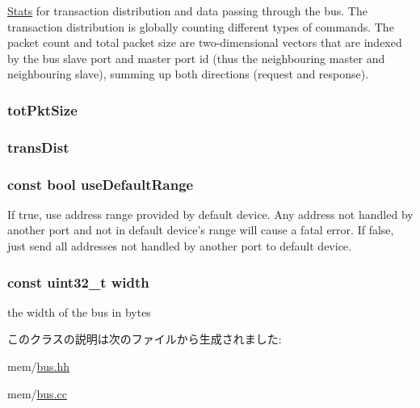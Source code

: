 \label{classBaseBus_ac7ddaff47c2ff8945ba85797af602673}
\hyperlink{namespaceStats}{Stats} for transaction distribution and data passing through the bus. The transaction distribution is globally counting different types of commands. The packet count and total packet size are two-\/dimensional vectors that are indexed by the bus slave port and master port id (thus the neighbouring master and neighbouring slave), summing up both directions (request and response). \hypertarget{classBaseBus_a1b2222f1cfbd8c191ad8d1099fd24848}{
\subsubsection[{totPktSize}]{ {\bf totPktSize}}}
\label{classBaseBus_a1b2222f1cfbd8c191ad8d1099fd24848}
\hypertarget{classBaseBus_a3eb88cd36449bb56229422858d34194d}{
\subsubsection[{transDist}]{ {\bf transDist}}}
\label{classBaseBus_a3eb88cd36449bb56229422858d34194d}
\hypertarget{classBaseBus_a1b0312e896847e0ef8bbad93fa73dc4c}{
\subsubsection[{useDefaultRange}]{\setlength{\rightskip}{0pt plus 5cm}const bool {\bf useDefaultRange}}}
\label{classBaseBus_a1b0312e896847e0ef8bbad93fa73dc4c}
If true, use address range provided by default device. Any address not handled by another port and not in default device's range will cause a fatal error. If false, just send all addresses not handled by another port to default device. \hypertarget{classBaseBus_a4c2292bdfd51cf112bcde1ad3fa55ac4}{
\subsubsection[{width}]{\setlength{\rightskip}{0pt plus 5cm}const {\bf uint32\_\-t} {\bf width}}}
\label{classBaseBus_a4c2292bdfd51cf112bcde1ad3fa55ac4}
the width of the bus in bytes 

このクラスの説明は次のファイルから生成されました:\begin{DoxyCompactItemize}
\item 
mem/\hyperlink{bus_8hh}{bus.hh}\item 
mem/\hyperlink{bus_8cc}{bus.cc}\end{DoxyCompactItemize}
